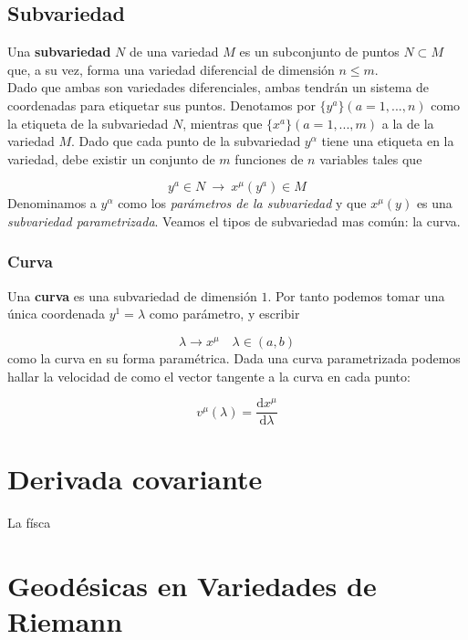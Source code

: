 \documentclass[12pt,a4paper]{book}
\numberwithin{equation}{section}
\numberwithin{figure}{section}
\newcommand{\D}{\mathrm{d}}
\newcommand{\derivadas}[2]{\frac{\D #1}{\D #2}}
\begin{document}
\subsection{Subvariedad}

Una \textbf{subvariedad} $N$ de una variedad $M$ es un subconjunto de puntos $N\subset M$ que, a su vez, forma una variedad diferencial de dimensión $n\leq m$. \\

Dado que ambas son variedades diferenciales, ambas tendrán un sistema de coordenadas para etiquetar sus puntos. Denotamos por $\{ y^a \} (a=1,...,n)$ como la etiqueta de la subvariedad $N$, mientras que  $\{ x^a \} (a=1,...,m)$ a la de la variedad $M$. Dado que cada punto de la subvariedad $y^{\alpha}$ tiene una etiqueta en la variedad, debe existir un conjunto de $m$ funciones de $n$ variables tales que

\begin{equation}
y^a \in N  \ \longrightarrow \ x^{\mu}(y^a) \in M
\end{equation}
Denominamos a $y^{\alpha}$ como los \textit{parámetros de la subvariedad} y que $x^{\mu}(y)$ es una \textit{subvariedad parametrizada}. Veamos el tipos de subvariedad mas común: la curva. 

\subsubsection{Curva}
Una \textbf{curva} es una subvariedad de dimensión $1$. Por tanto podemos tomar una única coordenada $y^1 = \lambda$ como parámetro, y escribir 

\begin{equation}
\lambda \rightarrow x^{\mu} \quad \lambda \in (a,b)
\end{equation}
como la curva en su forma paramétrica. Dada una curva parametrizada podemos hallar la velocidad de como el vector tangente a la curva en cada punto:

\begin{equation}
v^{\mu} (\lambda ) = \derivadas{x^{\mu}}{\lambda}
\end{equation}


\section{Derivada covariante}

La físca 


\section{Geodésicas en Variedades de Riemann}
\end{document}
